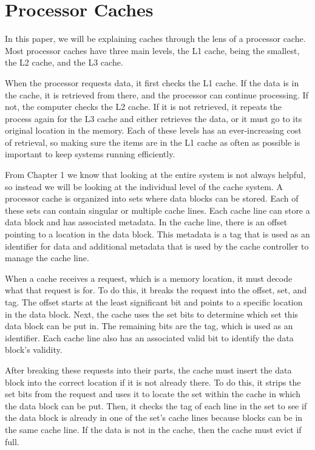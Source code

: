 

\chapter{Processor Caches}

In this paper, we will be explaining caches through the lens of a processor cache. Most processor caches have three main levels, the L1 cache, being the smallest, the L2 cache, and the L3 cache.


When the processor requests data, it first checks the L1 cache. If the data is in the cache, it is retrieved from there, and the processor can continue processing. If not, the computer checks the L2 cache. If it is not retrieved, it repeats the process again for the L3 cache and either retrieves the data, or it must go to its original location in the memory. Each of these levels has an ever-increasing cost of retrieval, so making sure the items are in the L1 cache as often as possible is important to keep systems running efficiently. 


From Chapter 1 we know that looking at the entire system is not always helpful, so instead we will be looking at the individual level of the cache system.
A processor cache is organized into sets where data blocks can be stored.
Each of these sets can contain singular or multiple cache lines. Each cache line can store a data block and has associated metadata. In the cache line, there is an offset pointing to a location in the data block. This metadata is a tag that is used as an identifier for data and additional metadata that is used by the cache controller to manage the cache line.




When a cache receives a request, which is a memory location, it must decode what that request is for. To do this, it breaks the request into the offset, set, and tag. The offset starts at the least significant bit and points to a specific location in the data block. Next, the cache uses the set bits to determine which set this data block can be put in. The remaining bits are the tag, which is used as an identifier. Each cache line also has an associated valid bit to identify the data block's validity.

After breaking these requests into their parts, the cache must insert the data block into the correct location if it is not already there. To do this, it strips the set bits from the request and uses it to locate the set within the cache in which the data block can be put. Then, it checks the tag of each line in the set to see if the data block is already in one of the set's cache lines because blocks can be in the same cache line. If the data is not in the cache, then the cache must evict if full.



